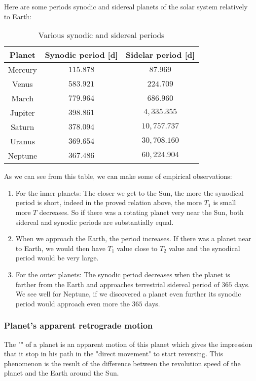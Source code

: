 	Here are some periods synodic and sidereal planets of the solar system relatively to Earth:
	\begin{table}[H]
	\begin{center}
			\begin{tabular}{|c|c|c|}
				\hline
				\multicolumn{1}{c}{\cellcolor{black!30}\textbf{Planet}} & 
\multicolumn{1}{c}{\cellcolor{black!30}\textbf{Synodic period [d]}} & 
\multicolumn{1}{c}{\cellcolor{black!30}\textbf{Sidelar period [d]}}  \\ \hline
		Mercury & $115.878$ & $87.969$\\ \hline
		Venus & $583.921$ & $224.709$\\ \hline
		March & $779.964$ & $686.960$\\ \hline
		Jupiter & $398.861$ & $4,335.355$\\ \hline
		Saturn & $378.094$ & $10,757.737$\\ \hline
		Uranus & $369.654$ & $30,708.160$\\ \hline
		Neptune & $367.486$ & $60,224.904$\\ \hline
	\end{tabular}
	\end{center}
	\caption{Various synodic and sidereal periods}
	\end{table}	
	As we can see from this table, we can make some of empirical observations:
	\begin{enumerate}
		\item For the inner planets: The closer we get to the Sun, the more the synodical period is short, indeed in the proved relation above, the more $T_1$ is small more $T$ decreases. So if there was a rotating planet very near the Sun, both sidereal and synodic periods are substantially equal.

		\item When we approach the Earth, the period increases. If there was a planet near to Earth, we would then have $T_1$ value close to $T_2$ value and the synodical period would be very large.

		\item For the outer planets: The synodic period decreases when the planet is farther from the Earth and approaches terrestrial sidereal period of $365$ days. We see well for Neptune, if we discovered a planet even further its synodic period would approach even more the $365$ days.
	\end{enumerate}
	
	\pagebreak
	\subsubsection{Planet's apparent retrograde motion}
	The "" of a planet is an apparent motion of this planet which gives the impression that it stop in his path in the "direct movement" to start reversing. This phenomenon is the result of the difference between the revolution speed of the planet and the Earth around the Sun.

